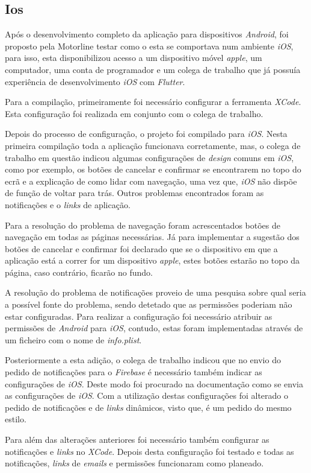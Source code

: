 \subsection{Ios}
Após o desenvolvimento completo da aplicação para dispositivos \textit{Android}, foi proposto pela Motorline testar como o esta se comportava num ambiente \textit{iOS}, para isso, esta disponibilizou acesso a um dispositivo móvel \textit{apple}, um computador, uma conta de programador e um colega de trabalho que já possuía experiência de desenvolvimento \textit{iOS} com \textit{Flutter}.

Para a compilação, primeiramente foi necessário configurar a ferramenta \textit{XCode}. Esta configuração foi realizada em conjunto com o colega de trabalho.

Depois do processo de configuração, o projeto foi compilado para \textit{iOS}. Nesta primeira compilação toda a aplicação funcionava corretamente, mas, o colega de trabalho em questão indicou algumas configurações de \textit{design} comuns em \textit{iOS}, como por exemplo, os botões de cancelar e confirmar se encontrarem no topo do ecrã e a explicação de como lidar com navegação, uma vez que, \textit{iOS} não dispõe de função de voltar para trás. Outros problemas encontrados foram as notificações e o \textit{links} de aplicação.

Para a resolução do problema de navegação foram acrescentados botões de navegação em todas as páginas necessárias. Já para implementar a sugestão dos botões de cancelar e confirmar foi declarado que se o dispositivo em que a aplicação está a correr for um dispositivo \textit{apple}, estes botões estarão no topo da página, caso contrário, ficarão no fundo.

A resolução do problema de notificações proveio de uma pesquisa sobre qual seria a possível fonte do problema, sendo detetado que as permissões poderiam não estar configuradas. Para realizar a configuração foi necessário atribuir as permissões de \textit{Android} para \textit{iOS}, contudo, estas foram implementadas através de um ficheiro com o nome de \textit{info.plist}.

Posteriormente a esta adição, o colega de trabalho indicou que no envio do pedido de notificações para o \textit{Firebase} é necessário também indicar as configurações de \textit{iOS}. Deste modo foi procurado na documentação como se envia as configurações de \textit{iOS}. Com a utilização destas configurações foi alterado o pedido de notificações e de \textit{links} dinâmicos, visto que, é um pedido do mesmo estilo.

Para além das alterações anteriores foi necessário também configurar  as notificações e \textit{links} no \textit{XCode}. Depois desta configuração foi testado e todas as notificações, \textit{links} de \textit{emails} e permissões funcionaram como planeado.